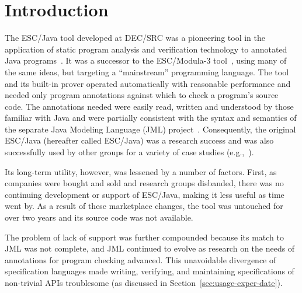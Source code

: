 \documentclass{llncs}
\begin{document}



\section{Introduction}

The ESC/Java tool developed at DEC/SRC was a pioneering tool in the
application of static program analysis and verification technology to
annotated Java programs~\cite{Flanagan-etal02}.  It was a successor to
the ESC/Modula-3 tool~\cite{ESCModula3}, using many of the same
ideas, but targeting a ``mainstream'' programming language.  The tool
and its built-in prover operated automatically with reasonable
performance and needed only program annotations against which to check
a program's source code.  The annotations needed were easily read,
written and understood by those familiar with Java and were partially
consistent with the syntax and semantics of the separate Java Modeling
Language (JML) project~\cite{jmlpapers,Leavens-etal00}.  Consequently,
the original ESC/Java (hereafter called ESC/Java) was a research
success and was also successfully used by other groups for a variety
of case studies (e.g.,~\cite{Hub03,HOP04}).


Its long-term utility, however, was lessened by a number of factors.
First, as companies were bought and sold and research groups
disbanded, there was no continuing development or support of ESC/Java,
making it less useful as time went by.  As a result of these
marketplace changes, the tool was untouched for over two years and its
source code was not available.

The problem of lack of support was further compounded because its
match to JML was not complete, and JML continued to evolve as research
on the needs of annotations for program checking advanced.  This
unavoidable divergence of specification languages made writing,
verifying, and maintaining specifications of non-trivial APIs
troublesome (as discussed in Section~\ref{sec:usage-exper-date}).
\end{document}
